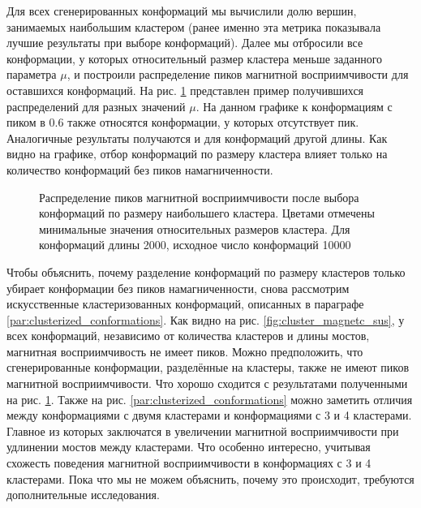 Для всех сгенерированных конформаций мы вычислили долю вершин, занимаемых наибольшим кластером (ранее именно эта метрика показывала лучшие результаты при выборе конформаций). Далее мы отбросили все конформации, у которых относительный размер кластера меньше заданного параметра $\mu$, и построили распределение пиков магнитной восприимчивости для оставшихся конформаций. На рис. \ref{fig:peaks_chosen_by_cluster} представлен пример получившихся распределений для разных значений $\mu$. На данном графике к конформациям с пиком в 0.6 также относятся конформации, у которых отсутствует пик. Аналогичные результаты получаются и для конформаций другой длины. Как видно на графике, отбор конформаций по размеру кластера влияет только на количество конформаций без пиков намагниченности.

\begin{figure}[ht]
	\centering
	
	\caption{Распределение пиков магнитной восприимчивости после выбора конформаций по размеру наибольшего кластера. Цветами отмечены минимальные значения относительных размеров кластера. Для конформаций длины 2000, исходное число конформаций 10000}
	\label{fig:peaks_chosen_by_cluster}

\end{figure}

Чтобы объяснить, почему разделение конформаций по размеру кластеров только убирает конформации без пиков намагниченности, снова рассмотрим искусственные кластеризованных конформаций, описанных в параграфе \ref{par:clusterized_conformations}. Как видно на рис. \ref{fig:cluster_magnetc_sus}, у всех конформаций, независимо от количества кластеров и длины мостов, магнитная восприимчивость не имеет пиков. Можно предположить, что сгенерированные конформации, разделённые на кластеры, также не имеют пиков магнитной восприимчивости. Что хорошо сходится с результатами полученными на рис. \ref{fig:peaks_chosen_by_cluster}. Также на рис. \ref{par:clusterized_conformations} можно заметить отличия между конформациями с двумя кластерами и конформациями с 3 и 4 кластерами. Главное из которых заключатся в увеличении магнитной восприимчивости при удлинении мостов между кластерами. Что особенно интересно, учитывая схожесть поведения магнитной восприимчивости в конформациях с 3 и 4 кластерами. Пока что мы не можем объяснить, почему это происходит, требуются дополнительные исследования.

